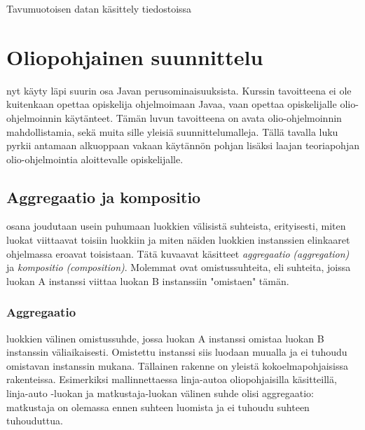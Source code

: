 \documentclass{tufte-book}
\newcommand{\eng}[1]{\textit{(#1)}}
\newcommand{\new}[1]{\textit{\gls{#1}}}
\newcommand{\neweng}[2]{\new{#1} \eng{#2}}
\newcommand{\code}[3]{
\begin{listing}
    \inputminted{java}{OhjelmointiopasEsimerkit/src/#1/#2.java}
    \caption{#3}
    \label{Java-#1-#2}
\end{listing}
}
\begin{document}
\code{week4}{BasicFileInputOutputStream}{Tavumuotoisen datan käsittely tiedostoissa}


\chapter{Oliopohjainen suunnittelu}
\label{suunnittelusta}

 nyt käyty läpi suurin osa Javan perusominaisuuksista. Kurssin tavoitteena
ei ole kuitenkaan opettaa opiskelija ohjelmoimaan Javaa, vaan opettaa opiskelijalle
olio-ohjelmoinnin käytänteet. Tämän luvun tavoitteena on avata olio-ohjelmoinnin mahdollistamia,
sekä muita sille yleisiä suunnittelumalleja. Tällä tavalla luku pyrkii antamaan alkuoppaan vakaan
käytännön pohjan lisäksi laajan teoriapohjan olio-ohjelmointia aloittevalle opiskelijalle.


\section{Aggregaatio ja kompositio}
\label{aggregaatiokompositio}

 osana joudutaan usein puhumaan luokkien välisistä
suhteista, erityisesti, miten luokat viittaavat toisiin luokkiin ja miten näiden luokkien
instanssien elinkaaret ohjelmassa eroavat toisistaan. Tätä kuvaavat käsitteet
\neweng{aggregaatio}{aggregation} ja \neweng{kompositio}{composition}. Molemmat ovat
omistussuhteita, eli suhteita, joissa luokan A instanssi viittaa luokan B instanssiin "omistaen"
tämän.

\subsection{Aggregaatio}
\label{aggregaatio}

 luokkien välinen omistussuhde, jossa luokan A instanssi omistaa
luokan B instanssin väliaikaisesti. Omistettu instanssi siis luodaan muualla ja ei tuhoudu
omistavan instanssin mukana. Tällainen rakenne on yleistä kokoelmapohjaisissa rakenteissa.
Esimerkiksi mallinnettaessa linja-autoa oliopohjaisilla käsitteillä, linja-auto -luokan ja
matkustaja-luokan välinen suhde olisi aggregaatio: matkustaja on olemassa ennen suhteen luomista
ja ei tuhoudu suhteen tuhouduttua.
\end{document}

